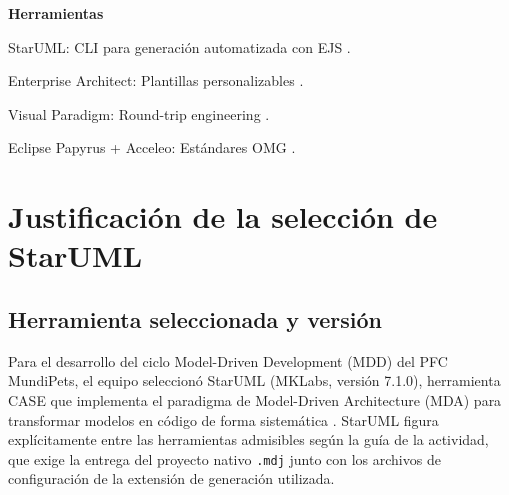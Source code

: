 \documentclass[journal,onecolumn]{IEEEtran}
\begin{document}
\textbf{Herramientas}

StarUML: CLI para generación automatizada con EJS \cite{Marcen2024}.

Enterprise Architect: Plantillas personalizables \cite{Marcen2024}.

Visual Paradigm: Round-trip engineering \cite{Marcen2024}.

Eclipse Papyrus + Acceleo: Estándares OMG \cite{Marcen2024}.

\section{Justificación de la selección de StarUML}

\subsection{Herramienta seleccionada y versión}
Para el desarrollo del ciclo Model-Driven Development (MDD) del PFC MundiPets, el equipo seleccionó StarUML (MKLabs, versión 7.1.0), herramienta CASE que implementa el paradigma de Model-Driven Architecture (MDA) para transformar modelos en código de forma sistemática \cite{Chitforoush2007, Korongo2022}. StarUML figura explícitamente entre las herramientas admisibles según la guía de la actividad, que exige la entrega del proyecto nativo \texttt{.mdj} junto con los archivos de configuración de la extensión de generación utilizada.
\end{document}
